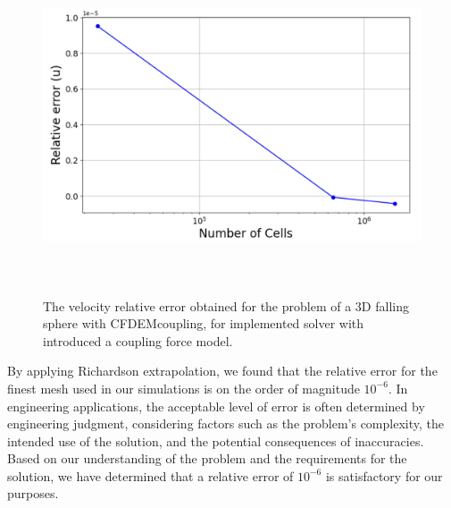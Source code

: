 \begin{figure}[!ht]
    \centering
    \includegraphics[width=16cm, height = 10cm]{GWU_Thesis_Sarmakeeva/Images/chap3/richardson_extrapoltation.png}
    \caption{The velocity relative error obtained for the problem of a 3D falling sphere with CFDEMcoupling, for implemented solver with introduced a coupling force model.}
   \label{fig:l2}
\end{figure}

By applying Richardson extrapolation, we found that the relative error for the finest mesh used in our simulations is on the order of magnitude $10^{-6}$. In engineering applications, the acceptable level of error is often determined by engineering judgment, considering factors such as the problem's complexity, the intended use of the solution, and the potential consequences of inaccuracies. Based on our understanding of the problem and the requirements for the solution, we have determined that a relative error of $10^{-6}$ is satisfactory for our purposes.



